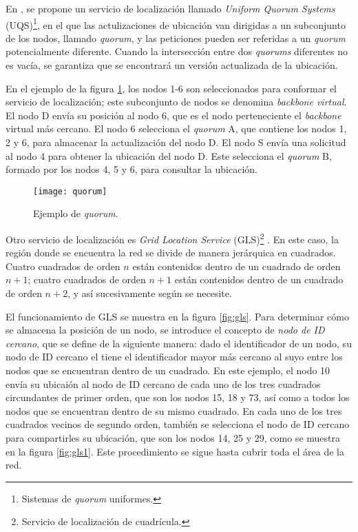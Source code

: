 En \cite{Haas1999}, se propone un servicio de localización llamado
\textit{Uniform Quorum Systems} (UQS)\footnote{Sistemas de \textit{quorum}
uniformes.}, en el que las actulizaciones de ubicación van dirigidas a un
subconjunto de los nodos, llamado \textit{quorum}, y las peticiones pueden
ser referidas a un \textit{quorum} potencialmente diferente. Cuando la
intersección entre dos \textit{quorums} diferentes no es vacía, se garantiza
que se encontrará un versión actualizada de la ubicación.

En el ejemplo de la figura \ref{fig:quorum}, los nodos 1-6 son seleccionados
para conformar el servicio de localización; este subconjunto de nodos se
denomina \textit{backbone virtual}. El nodo D envía su posición al nodo 6,
que es el nodo perteneciente el \textit{backbone} virtual más cercano. El nodo
6 selecciona el \textit{quorum} A, que contiene los nodos 1, 2 y 6, para
almacenar la actualización del nodo D. El nodo S envía una solicitud al nodo 4
para obtener la ubicación del nodo D. Este selecciona el \textit{quorum} B,
formado por los nodos 4, 5 y 6, para consultar la ubicación.

\begin{figure}[th]
\centering
\texttt{[image: quorum]}
\decoRule
\caption[Ejemplo de \textit{quorum}]{Ejemplo de \textit{quorum}\protect\footnotemark.}
\label{fig:quorum}
\end{figure}


Otro servicio de localización es \textit{Grid Location Service}
(GLS)\footnote{Servicio de localización de cuadrícula.} \cite{Li2000}. En este
caso, la región donde se encuentra la red se divide de manera jerárquica en
cuadrados. Cuatro cuadrados de orden $n$ están contenidos dentro de un cuadrado
de orden $n+1$; cuatro cuadrados de orden $n+1$ están contenidos dentro de un
cuadrado de orden $n+2$, y así sucesivamente según se necesite.

El funcionamiento de GLS se muestra en la figura \ref{fig:gls}. Para determinar
cómo se almacena la posición de un nodo, se introduce el concepto de
\textit{nodo de ID cercano}, que se define de la siguiente manera: dado el
identificador de un nodo, su nodo de ID cercano el tiene el identificador mayor
más cercano al suyo entre los nodos que se encuentran dentro de un cuadrado. En
este ejemplo, el nodo 10 envía su ubicaión al nodo de ID cercano de cada uno de
los tres cuadrados circundantes de primer orden, que son los nodos 15, 18 y 73,
así como a todos los nodos que se encuentran dentro de su mismo cuadrado. En
cada uno de los tres cuadrados vecinos de segundo orden, también se selecciona
el nodo de ID cercano para compartirles su ubicación, que son los nodos 14, 25
y 29, como se muestra en la figura \ref{fig:gls1}. Este procedimiento se sigue
hasta cubrir toda el área de la red.

